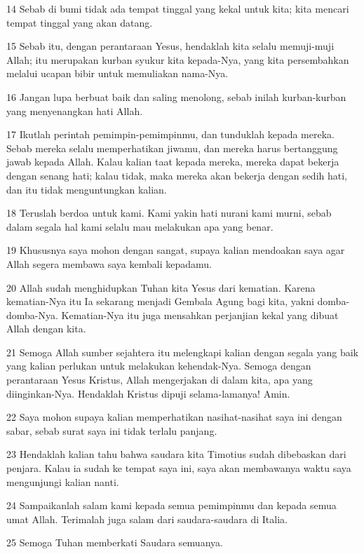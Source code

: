 \par 14 Sebab di bumi tidak ada tempat tinggal yang kekal untuk kita; kita mencari tempat tinggal yang akan datang.
\par 15 Sebab itu, dengan perantaraan Yesus, hendaklah kita selalu memuji-muji Allah; itu merupakan kurban syukur kita kepada-Nya, yang kita persembahkan melalui ucapan bibir untuk memuliakan nama-Nya.
\par 16 Jangan lupa berbuat baik dan saling menolong, sebab inilah kurban-kurban yang menyenangkan hati Allah.
\par 17 Ikutlah perintah pemimpin-pemimpinmu, dan tunduklah kepada mereka. Sebab mereka selalu memperhatikan jiwamu, dan mereka harus bertanggung jawab kepada Allah. Kalau kalian taat kepada mereka, mereka dapat bekerja dengan senang hati; kalau tidak, maka mereka akan bekerja dengan sedih hati, dan itu tidak menguntungkan kalian.
\par 18 Teruslah berdoa untuk kami. Kami yakin hati nurani kami murni, sebab dalam segala hal kami selalu mau melakukan apa yang benar.
\par 19 Khususnya saya mohon dengan sangat, supaya kalian mendoakan saya agar Allah segera membawa saya kembali kepadamu.
\par 20 Allah sudah menghidupkan Tuhan kita Yesus dari kematian. Karena kematian-Nya itu Ia sekarang menjadi Gembala Agung bagi kita, yakni domba-domba-Nya. Kematian-Nya itu juga mensahkan perjanjian kekal yang dibuat Allah dengan kita.
\par 21 Semoga Allah sumber sejahtera itu melengkapi kalian dengan segala yang baik yang kalian perlukan untuk melakukan kehendak-Nya. Semoga dengan perantaraan Yesus Kristus, Allah mengerjakan di dalam kita, apa yang diinginkan-Nya. Hendaklah Kristus dipuji selama-lamanya! Amin.
\par 22 Saya mohon supaya kalian memperhatikan nasihat-nasihat saya ini dengan sabar, sebab surat saya ini tidak terlalu panjang.
\par 23 Hendaklah kalian tahu bahwa saudara kita Timotius sudah dibebaskan dari penjara. Kalau ia sudah ke tempat saya ini, saya akan membawanya waktu saya mengunjungi kalian nanti.
\par 24 Sampaikanlah salam kami kepada semua pemimpinmu dan kepada semua umat Allah. Terimalah juga salam dari saudara-saudara di Italia.
\par 25 Semoga Tuhan memberkati Saudara semuanya.


